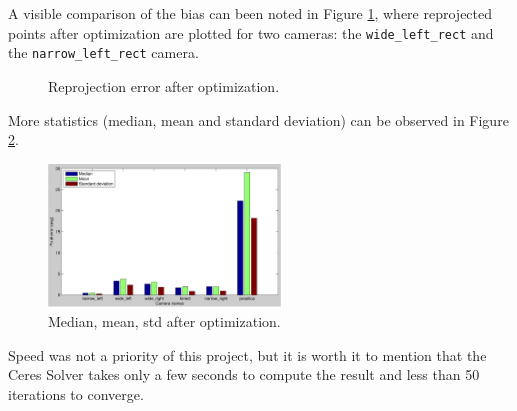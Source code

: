 A visible comparison of the bias can been noted in Figure \ref{fig:reprojection}, where reprojected points after optimization are plotted for two cameras: the \texttt{wide\_left\_rect} and the \texttt{narrow\_left\_rect} camera.
\begin{figure}[!htbp]
  \centering
  \caption{Reprojection error after optimization.}
  \label{fig:reprojection}
\end{figure}



More statistics (median, mean and standard deviation) can be observed in Figure \ref{fig:stats}.
\begin{figure}[!htbp]
 \centering
 \includegraphics[width=0.55\textwidth]{images/stats.pdf}
 \caption{Median, mean, std after optimization.}
 \label{fig:stats}
\end{figure}


Speed was not a priority of this project, but it is worth it to mention that the Ceres Solver takes only a few seconds to compute the result and less than 50 iterations to converge.


